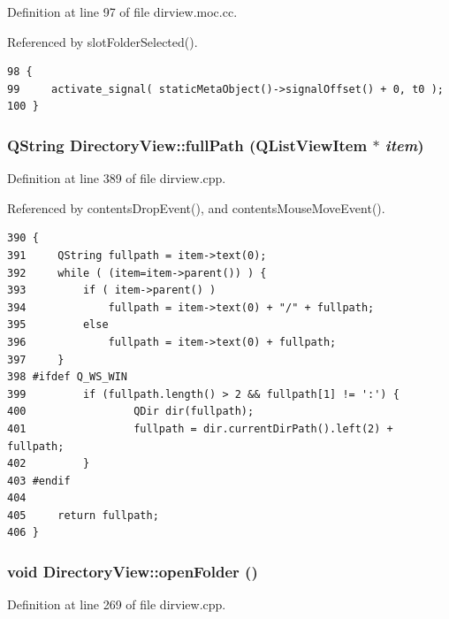 Definition at line 97 of file dirview.moc.cc.

Referenced by slot\-Folder\-Selected().



\footnotesize\begin{verbatim}98 {
99     activate_signal( staticMetaObject()->signalOffset() + 0, t0 );
100 }
\end{verbatim}\normalsize 
{}
\subsubsection{\setlength{\rightskip}{0pt plus 5cm}QString Directory\-View::full\-Path (QList\-View\-Item $\ast$ {\em item})\hspace{0.3cm}{\tt  [private]}}\label{classDirectoryView_DirectoryViewd0}




Definition at line 389 of file dirview.cpp.

Referenced by contents\-Drop\-Event(), and contents\-Mouse\-Move\-Event().



\footnotesize\begin{verbatim}390 {
391     QString fullpath = item->text(0);
392     while ( (item=item->parent()) ) {
393         if ( item->parent() )
394             fullpath = item->text(0) + "/" + fullpath;
395         else
396             fullpath = item->text(0) + fullpath;
397     }
398 #ifdef Q_WS_WIN
399         if (fullpath.length() > 2 && fullpath[1] != ':') {
400                 QDir dir(fullpath);
401                 fullpath = dir.currentDirPath().left(2) + fullpath;
402         }
403 #endif
404         
405     return fullpath;
406 }
\end{verbatim}\normalsize 
{}
\subsubsection{\setlength{\rightskip}{0pt plus 5cm}void Directory\-View::open\-Folder ()\hspace{0.3cm}{\tt  [protected, slot]}}\label{classDirectoryView_DirectoryViewj1}




Definition at line 269 of file dirview.cpp.


